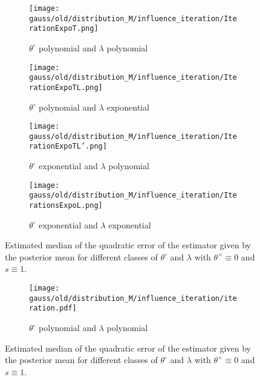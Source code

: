 \begin{figure}
\centering
\begin{subfigure}{.5\textwidth}
  \centering
  \texttt{[image: gauss/old/distribution\_M/influence\_iteration/IterationExpoT.png]}
  \caption{$\theta^{\circ}$ polynomial and $\lambda$ polynomial}
  \label{fig3:sub1}
\end{subfigure}%
\begin{subfigure}{.5\textwidth}
  \centering
  \texttt{[image: gauss/old/distribution\_M/influence\_iteration/IterationExpoTL.png]}
  \caption{$\theta^{\circ}$ polynomial and $\lambda$ exponential}
  \label{fig3:sub2}
\end{subfigure}
\begin{subfigure}{.5\textwidth}
  \centering
  \texttt{[image: gauss/old/distribution\_M/influence\_iteration/IterationExpoTL'.png]}
  \caption{$\theta^{\circ}$ exponential and $\lambda$ polynomial}
  \label{fig3:sub3}
\end{subfigure}%
\begin{subfigure}{.5\textwidth}
  \centering
  \texttt{[image: gauss/old/distribution\_M/influence\_iteration/IterationsExpoL.png]}
  \caption{$\theta^{\circ}$ exponential and $\lambda$ exponential}
  \label{fig3:sub4}
\end{subfigure}
\caption{Estimated median of the quadratic error of the estimator given by the posterior mean for different classes of $\theta^{\circ}$ and $\lambda$ with $\theta^{\times} \equiv 0$ and $s \equiv 1$.}
\label{EQM}
\end{figure}






\begin{figure}
\centering
\begin{subfigure}{.5\textwidth}
  \centering
  \texttt{[image: gauss/old/distribution\_M/influence\_iteration/iteration.pdf]}
  \caption{$\theta^{\circ}$ polynomial and $\lambda$ polynomial}
  \label{fig3:sub1}
\end{subfigure}%
\caption{Estimated median of the quadratic error of the estimator given by the posterior mean for different classes of $\theta^{\circ}$ and $\lambda$ with $\theta^{\times} \equiv 0$ and $s \equiv 1$.}
\label{EQM}
\end{figure}



